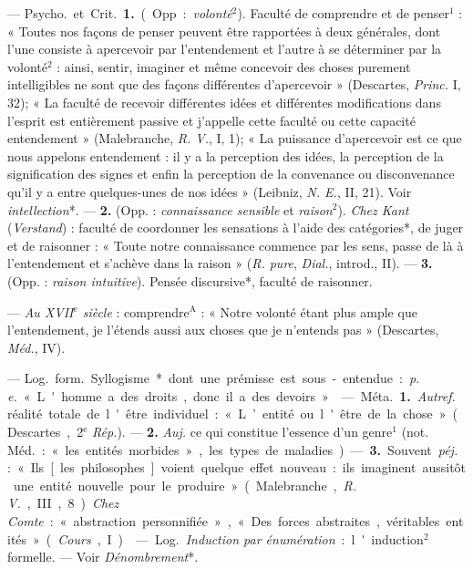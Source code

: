 \begin{itemize}[leftmargin=1cm, label=, itemsep=1pt]
 — \si{Psycho.} et \si{Crit.} {\bf 1.}
(Opp. : {\it volonté}$^2$). Faculté de comprendre et de penser$^1$ :
« Toutes nos
façons de penser peuvent être rapportées à deux générales, dont l’une
consiste à apercevoir par l’entendement et l’autre à se déterminer par
la volonté$^2$ : ainsi, sentir, imaginer
et même concevoir des choses purement intelligibles ne sont que des
façons différentes d’apercevoir »
(Descartes, {\it Princ.} I, 32); « La
faculté de recevoir différentes idées
et différentes modifications dans
l'esprit est entièrement passive et
j'appelle cette faculté ou cette capacité entendement » (Malebranche,
{\it R. V.}, I, 1); « La puissance d’apercevoir est ce que nous appelons
entendement : il y a la perception
des idées, la perception de la signification des signes et enfin la perception de la convenance ou disconvenance qu'il y a entre quelques-unes de nos idées » (Leibniz, {\it N. E.},
II, 21). Voir {\it intellection}*. — {\bf 2.}
(Opp. : {\it connaissance sensible} et
{\it raison}$^2$). {\it Chez Kant} ({\it Verstand}) :
faculté de coordonner les sensations à l’aide des catégories*, de
juger et de raisonner : « Toute notre
connaissance commence par les sens,
passe de là à l’entendement et
s'achève dans la raison » ({\it R. pure},
{\it Dial.}, introd., II). — {\bf 3.} (Opp. :
{\it raison intuitive}). Pensée discursive*,
faculté de raisonner.

 — {\it Au XVII$^\text{e}$ siècle} : comprendre$^\text{A}$ :
« Notre volonté étant plus ample que l’entendement, je l’étends
aussi aux choses que je n'entends pas » (Descartes, {\it Méd.}, IV).

 — \si{Log.} \si{form.} Syllogisme* dont une prémisse est
sous-entendue : {\it p. e.} « L'homme a des droits, donc il a des devoirs ».

 — \si{Méta.} {\bf 1.} {\it Autref.} réalité
totale de l'être individuel : « L’entité ou l'être de la chose » (Descartes, 2$^\text{e}$ {\it Rép.}). — {\bf 2.} {\it Auj.} ce qui
constitue l’essence d’un genre$^1$ (not.
\si{Méd.} : « les entités morbides », les
types de maladies). — {\bf 3.} Souvent
 {\it péj.} : « Ils [les philosophes] voient
quelque effet nouveau : ils imaginent aussitôt une entité nouvelle
pour le produire » (Malebranche, {\it R. V.}, III, 8). {\it Chez Comte} :
« abstraction personnifiée », « Des forces abstraites, véritables entités »
({\it Cours}, I).

 — \si{Log.} {\it Induction par énumération} :
l'induction$^2$ formelle. — Voir {\it Dénombrement}*.


\end{itemize}
